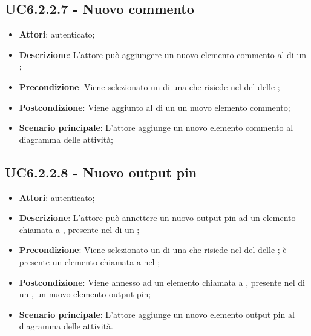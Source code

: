 \subsection{UC6.2.2.7 - Nuovo commento}
\label{ssec:UC6.2.2.7}
\begin{itemize}
\item \textbf{Attori}:  autenticato;
\item \textbf{Descrizione}: L'attore può aggiungere un nuovo elemento commento al  di un ;
\item \textbf{Precondizione}: Viene selezionato un  di una  che risiede nel  del  delle  ;
\item \textbf{Postcondizione}: Viene aggiunto al  di un  un nuovo elemento commento;
\item \textbf{Scenario principale}: L'attore aggiunge un nuovo elemento commento al diagramma delle attività;
\end{itemize}
\subsection{UC6.2.2.8 - Nuovo output pin}
\label{ssec:UC6.2.2.8}
\begin{itemize}
\item \textbf{Attori}:  autenticato;
\item \textbf{Descrizione}: L'attore può annettere un nuovo output pin ad un elemento chiamata a , presente nel  di un ;
\item \textbf{Precondizione}: Viene selezionato un  di una  che risiede nel  del  delle  ; è presente un elemento chiamata a  nel ;
\item \textbf{Postcondizione}: Viene annesso ad un elemento chiamata a , presente nel  di un , un nuovo elemento output pin;
\item \textbf{Scenario principale}: L'attore aggiunge un nuovo elemento output pin al diagramma delle attività.
\end{itemize}
\newpage
